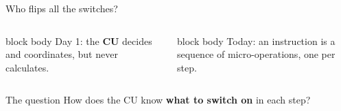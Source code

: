 \documentclass[aspectratio=169,10pt]{beamer}
\begin{document}
\begin{frame}{Who flips all the switches?}
  \begin{columns}[c,onlytextwidth]
      \begin{beamercolorbox}[rounded=true,sep=0.12cm,wd=\linewidth]{block body}
        \centering\small
        Day 1: the \textbf{CU} decides and coordinates, but never calculates.
      \end{beamercolorbox}
      \vspace{0.2cm}
      \begin{beamercolorbox}[rounded=true,sep=0.12cm,wd=\linewidth]{block body}
        \centering\small
        Today: an instruction is a sequence of micro-operations, one per step.
      \end{beamercolorbox}
      \centering
  \end{columns}
  \vfill
  \begin{alertblock}{The question}
    \small How does the CU know \textbf{what to switch on} in each step?
  \end{alertblock}
\end{frame}
\end{document}
